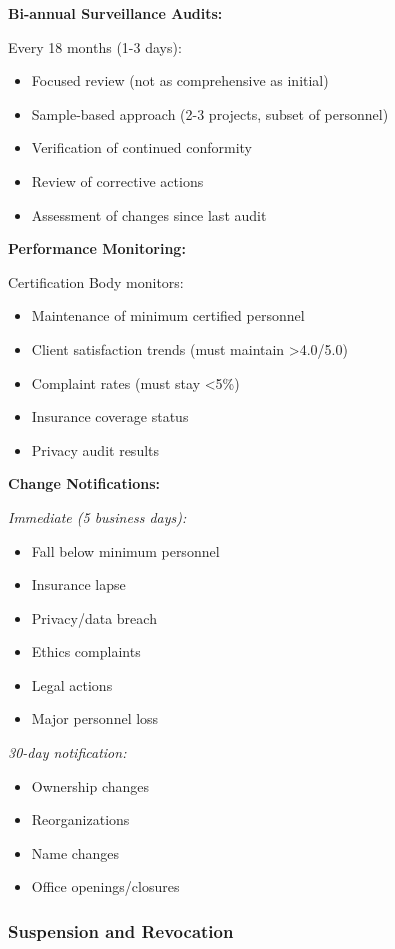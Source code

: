 \documentclass[11pt,a4paper]{article}
\begin{document}
\textbf{Bi-annual Surveillance Audits:}

Every 18 months (1-3 days):
\begin{itemize}
\item Focused review (not as comprehensive as initial)
\item Sample-based approach (2-3 projects, subset of personnel)
\item Verification of continued conformity
\item Review of corrective actions
\item Assessment of changes since last audit
\end{itemize}

\textbf{Performance Monitoring:}

Certification Body monitors:
\begin{itemize}
\item Maintenance of minimum certified personnel
\item Client satisfaction trends (must maintain >4.0/5.0)
\item Complaint rates (must stay <5\%)
\item Insurance coverage status
\item Privacy audit results
\end{itemize}

\textbf{Change Notifications:}

\textit{Immediate (5 business days):}
\begin{itemize}
\item Fall below minimum personnel
\item Insurance lapse
\item Privacy/data breach
\item Ethics complaints
\item Legal actions
\item Major personnel loss
\end{itemize}

\textit{30-day notification:}
\begin{itemize}
\item Ownership changes
\item Reorganizations
\item Name changes
\item Office openings/closures
\end{itemize}

\subsubsection{Suspension and Revocation}
\end{document}
